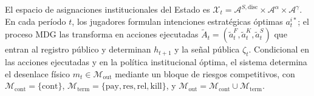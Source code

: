 \documentclass[review,authoryear,12pt]{elsarticle}
\theoremstyle{plain}
\theoremstyle{definition}
\newcommand{\1}{\mathbf{1}}
\begin{document}
El espacio de asignaciones institucionales del Estado es $\mathcal{X}_t=\mathcal{A}^{S,\mathrm{disc}}\times\mathcal{A}^{\alpha}\times\mathcal{A}^{\gamma}$. En cada período $t$, los jugadores formulan intenciones estratégicas óptimas $a_t^{i\ast}$; el proceso MDG las transforma en acciones ejecutadas $\tilde{A}_t=(\tilde{a}_t^F,\tilde{a}_t^K,\tilde{a}_t^S)$ que entran al registro público y determinan $h_{t+1}$ y la señal pública $\zeta_t$. Condicional en las acciones ejecutadas y en la política institucional óptima, el sistema determina el desenlace físico $m_t\in\mathcal{M}_{\mathrm{out}}$ mediante un bloque de riesgos competitivos, con $\mathcal{M}_{\mathrm{cont}}=\{\mathrm{cont}\}$, $\mathcal{M}_{\mathrm{term}}=\{\mathrm{pay},\mathrm{res},\mathrm{rel},\mathrm{kill}\}$, y $\mathcal{M}_{\mathrm{out}}=\mathcal{M}_{\mathrm{cont}}\cup\mathcal{M}_{\mathrm{term}}$.
\end{document}
